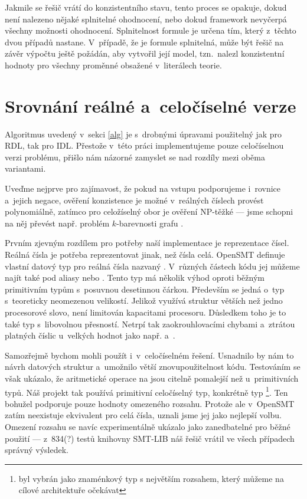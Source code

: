 Jakmile se řešič vrátí do konzistentního stavu, tento proces se opakuje, dokud není nalezeno nějaké splnitelné ohodnocení, nebo dokud framework nevyčerpá všechny možnosti ohodnocení. Splnitelnost formule je určena tím, který z~těchto dvou případů nastane. V~případě, že je formule splnitelná, může být řešič na závěr výpočtu ještě požádán, aby vytvořil její model, tzn.~nalezl konzistentní hodnoty pro všechny proměnné obsažené v~literálech teorie.

\section{Srovnání reálné a~celočíselné verze} \label{int_v_real}

Algoritmus uvedený v~sekci \ref{alg} je s~drobnými úpravami použitelný jak pro RDL, tak pro IDL. Přestože v~této práci implementujeme pouze celočíselnou verzi problému, přišlo nám názorné zamyslet se nad rozdíly mezi oběma variantami.

Uveďme nejprve pro zajímavost, že pokud na vstupu podporujeme i~rovnice a~jejich negace, ověření konzistence je možné v~reálných číslech provést polynomiálně, zatímco pro celožíselný obor je ověření NP-těžké --- jsme schopni na něj převést např. problém $k$-barevnosti grafu \cite{slides}.

Prvním zjevným rozdílem pro potřeby naší implementace je reprezentace čísel. Reálná čísla je potřeba reprezentovat jinak, než čísla celá. OpenSMT definuje vlastní datový typ pro reálná čísla nazvaný . V~různých částech kódu jej můžeme najít také pod aliasy  nebo . Tento typ má několik výhod oproti běžným primitivním typům s~posuvnou desetinnou čárkou. Především se jedná o~typ s~teoreticky neomezenou velikostí. Jelikož využívá struktur větších než jedno procesorové slovo, není limitován kapacitami procesoru. Důsledkem toho je to také typ s~libovolnou přesností. Netrpí tak zaokrouhlovacími chybami a~ztrátou platných číslic u~velkých hodnot jako např.  a~.

Samozřejmě bychom mohli  použít i~v~celočíselném řešení. Usnadnilo by nám to návrh datových struktur a~umožnilo větší znovupoužitelnost kódu. Testováním se však ukázalo, že aritmetické operace na  jsou citelně pomalejší než u~primitivních typů. Náš projekt tak používá primitivní celočíselný typ, konkrétně typ \footnote{ byl vybrán jako znaménkový typ s největším rozsahem, který můžeme na cílové architektuře očekávat}. Ten bohužel podporuje pouze hodnoty omezeného rozsahu. Protože ale v~OpenSMT zatím neexistuje ekvivalent  pro celá čísla, uznali jsme jej jako nejlepší volbu. Omezení rozsahu se navíc experimentálně ukázalo jako zanedbatelné pro běžné použití --- z~834(?) %
testů knihovny SMT-LIB náš řešič vrátil ve všech případech správný výsledek.

